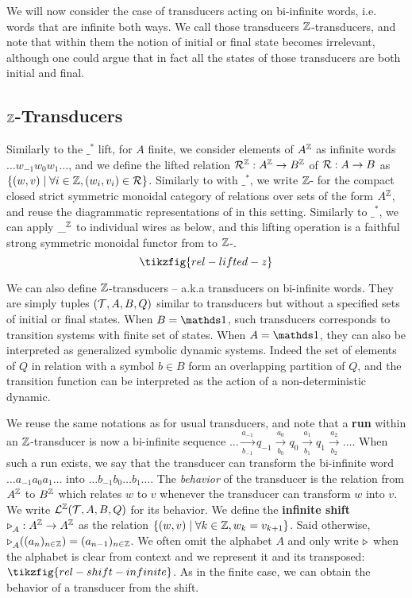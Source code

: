
We will now consider the case of transducers acting on bi-infinite words, i.e. words that are infinite both ways. 
We call those transducers ${\mathbb{Z}}$-transducers, and note that within them the notion of initial or final state becomes irrelevant, although one could argue that in fact all the states of those transducers are both initial and final.


\subsection{${\mathbb{Z}}$-Transducers}
Similarly to the $\_^*$ lift, for $A$ finite, we consider elements of $A^{{\mathbb{Z}}}$ as infinite words $\dots w_{-1}w_0w_1 \dots$, and we define the lifted relation ${\mathcal{R}}^{{\mathbb{Z}}} : A^{{\mathbb{Z}}} \to B^{{\mathbb{Z}}}$ of ${\mathcal{R}} : A \to B$ as $\{(w,v)\mid \forall i \in {\mathbb{Z}}, (w_i,v_i) \in {\mathcal{R}}\}$. 
Similarly to  with $\_^*$, we write ${\mathbb{Z}}$- for the compact closed strict symmetric monoidal category of relations over sets of the form $A^{\mathbb{Z}}$, and reuse the diagrammatic representations of  in this setting. Similarly to $\_^*$, we can apply $\_^{{\mathbb{Z}}}$ to individual wires as below, and this lifting operation is a faithful strong symmetric monoidal functor from  to ${\mathbb{Z}}$-.
\[ \tikzfig{rel-lifted-z}\]

We can also define ${\mathbb{Z}}$-transducers -- a.k.a transducers on bi-infinite words. They are simply tuples $({\mathcal{T}},A,B,Q)$ similar to transducers but without a specified sets of initial or final states. When $B=\one$, such transducers corresponds to transition systems with finite set of states. When $A=\one$, they can also be interpreted as generalized symbolic dynamic systems. Indeed the set of elements of $Q$ in relation with a symbol $b\in B$ form an overlapping partition of $Q$, and the transition function can be interpreted as the action of a non-deterministic dynamic.

We reuse the same notations as for usual transducers, and note that a \textbf{run} within an ${\mathbb{Z}}$-transducer is now a bi-infinite sequence $\dots \xrightarrow[b_{-1}]{a_{-1}} q_{-1} \xrightarrow[b_0]{a_0} q_0 \xrightarrow[b_1]{a_1} q_1 \xrightarrow[b_2]{a_2} \dots$. 
When such a run exists, we say that the transducer can transform the bi-infinite word $\dots a_{-1}a_0a_1\dots$ into $\dots b_{-1}b_0\dots b_1\dots$.
The \emph{behavior} of the transducer is the relation from $A^{\mathbb{Z}}$ to $B^{\mathbb{Z}}$ which relates $w$ to $v$ whenever the transducer can transform $w$ into $v$. We write ${\mathcal{L}}^{\mathbb{Z}}({\mathcal{T}},A,B,Q)$ for its behavior. 
We define the \textbf{infinite shift} $\shift{}{}_A : A^\ZZ \to A^\ZZ$ as the relation $\{ (w,v) \mid \forall k \in {\mathbb{Z}}, w_k = v_{k+1} \}$. 
Said otherwise, $\shift{}{}_A((a_n)_{n \in \ZZ}) = (a_{n-1})_{n \in \ZZ}$. 
We often omit the alphabet $A$ and only write $\shift{}{}$ when the alphabet is clear from context and we represent it and its transposed:
$\tikzfig{rel-shift-infinite}$. As in the finite case, we can obtain the behavior of a transducer from the shift.

